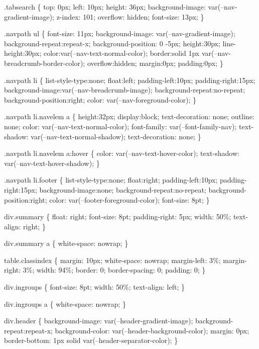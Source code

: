 .tabsearch \{ top\+: 0px; left\+: 10px; height\+: 36px; background-\/image\+: var(--nav-\/gradient-\/image); z-\/index\+: 101; overflow\+: hidden; font-\/size\+: 13px; \}

.navpath ul \{ font-\/size\+: 11px; background-\/image\+: var(--nav-\/gradient-\/image); background-\/repeat\+:repeat-\/x; background-\/position\+: 0 -\/5px; height\+:30px; line-\/height\+:30px; color\+:var(--nav-\/text-\/normal-\/color); border\+:solid 1px var(--nav-\/breadcrumb-\/border-\/color); overflow\+:hidden; margin\+:0px; padding\+:0px; \}

.navpath li \{ list-\/style-\/type\+:none; float\+:left; padding-\/left\+:10px; padding-\/right\+:15px; background-\/image\+:var(--nav-\/breadcrumb-\/image); background-\/repeat\+:no-\/repeat; background-\/position\+:right; color\+: var(--nav-\/foreground-\/color); \}

.navpath li.\+navelem a \{ height\+:32px; display\+:block; text-\/decoration\+: none; outline\+: none; color\+: var(--nav-\/text-\/normal-\/color); font-\/family\+: var(--font-\/family-\/nav); text-\/shadow\+: var(--nav-\/text-\/normal-\/shadow); text-\/decoration\+: none; \}

.navpath li.\+navelem a\+:hover \{ color\+: var(--nav-\/text-\/hover-\/color); text-\/shadow\+: var(--nav-\/text-\/hover-\/shadow); \}

.navpath li.\+footer \{ list-\/style-\/type\+:none; float\+:right; padding-\/left\+:10px; padding-\/right\+:15px; background-\/image\+:none; background-\/repeat\+:no-\/repeat; background-\/position\+:right; color\+: var(--footer-\/foreground-\/color); font-\/size\+: 8pt; \}

div.\+summary \{ float\+: right; font-\/size\+: 8pt; padding-\/right\+: 5px; width\+: 50\%; text-\/align\+: right; \}

div.\+summary a \{ white-\/space\+: nowrap; \}

table.\+classindex \{ margin\+: 10px; white-\/space\+: nowrap; margin-\/left\+: 3\%; margin-\/right\+: 3\%; width\+: 94\%; border\+: 0; border-\/spacing\+: 0; padding\+: 0; \}

div.\+ingroups \{ font-\/size\+: 8pt; width\+: 50\%; text-\/align\+: left; \}

div.\+ingroups a \{ white-\/space\+: nowrap; \}

div.\+header \{ background-\/image\+: var(--header-\/gradient-\/image); background-\/repeat\+:repeat-\/x; background-\/color\+: var(--header-\/background-\/color); margin\+: 0px; border-\/bottom\+: 1px solid var(--header-\/separator-\/color); \}

